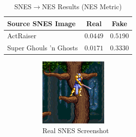 \documentclass[10pt,twocolumn,letterpaper]{article}
\begin{document}
\begin{table}[H]
   \begin{center}
      \begin{tabular}{|l|c|c|}
         \hline
         Source SNES Image      & Real     & Fake     \\
         \hline\hline
         ActRaiser              & $0.0449$ & $0.5190$ \\
         Super Ghouls 'n Ghosts & $0.0171$ & $0.3330$ \\
         \hline
      \end{tabular}
   \end{center}
   \caption{SNES$\rightarrow$NES Results (NES Metric)}
   \label{tab:nesresults}
\end{table}

\begin{figure}[H]
   \centering
   \begin{subfigure}[b]{0.225\textwidth}
      \includegraphics[width=\textwidth]{figures/snes_to_nes/AV_Mahjong_Club_(J)_(Unl)_copy__ucc__8_real_B.png}
      \caption{Real SNES Screenshot}
      \label{fig:ss1a}
   \end{subfigure}
   \begin{subfigure}[b]{0.225\textwidth}

\end{subfigure}
\end{figure}
\end{document}
